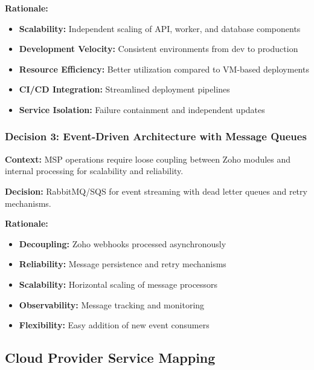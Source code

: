 \textbf{Rationale:}
\begin{itemize}
  \item \textbf{Scalability:} Independent scaling of API, worker, and database components
  \item \textbf{Development Velocity:} Consistent environments from dev to production
  \item \textbf{Resource Efficiency:} Better utilization compared to VM-based deployments
  \item \textbf{CI/CD Integration:} Streamlined deployment pipelines
  \item \textbf{Service Isolation:} Failure containment and independent updates
\end{itemize}

\subsubsection{Decision 3: Event-Driven Architecture with Message Queues}

\textbf{Context:} MSP operations require loose coupling between Zoho modules and internal processing for scalability and reliability.

\textbf{Decision:} RabbitMQ/SQS for event streaming with dead letter queues and retry mechanisms.

\textbf{Rationale:}
\begin{itemize}
  \item \textbf{Decoupling:} Zoho webhooks processed asynchronously
  \item \textbf{Reliability:} Message persistence and retry mechanisms
  \item \textbf{Scalability:} Horizontal scaling of message processors
  \item \textbf{Observability:} Message tracking and monitoring
  \item \textbf{Flexibility:} Easy addition of new event consumers
\end{itemize}

\subsection{Cloud Provider Service Mapping}

